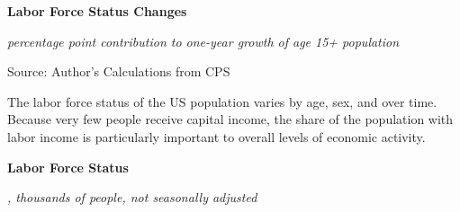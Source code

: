 \documentclass{report}
\makeatletter
\newcommand{\tbllink}[1]{\href{https://raw.githubusercontent.com/bdecon/US-chartbook/master/chartbook/data/#1}{\faTable}}
\newcommand*\short[1]{\expandafter\@gobbletwo\number\numexpr#1\relax}
\newcommand{\ctsbar}[5]{
		\addplot[ybar stacked, bar width=#5, draw opacity=0, fill=#1] 
			table [x=#2, y=#3, col sep=comma]{#4};}
\newcommand{\dateaxisticks}{
		date coordinates in=x, axis line style={draw=none},
		xmax={2020-10-01},
		max space between ticks=40,	    
		xtick={{1990-01-01}, {1992-01-01}, {1994-01-01}, 
			{1996-01-01}, {1998-01-01}, {2000-01-01}, 
			{2002-01-01}, {2004-01-01}, {2006-01-01},
			{2008-01-01}, {2010-01-01}, {2012-01-01}, {2014-01-01},
		    {2016-01-01}, {2018-01-01}, {2020-01-01}},
		minor xtick={{1989-01-01}, {1991-01-01}, {1993-01-01},
			{1995-01-01}, {1997-01-01}, {1999-01-01}, 
			{2001-01-01}, {2003-01-01}, {2005-01-01}, {2007-01-01},
		    {2009-01-01}, {2011-01-01}, {2013-01-01}, {2015-01-01},
		    {2017-01-01}, {2019-01-01}},
		enlarge y limits={0.06}, enlarge x limits={0.01},
		}
\newcommand{\bbar}[2]{extra #1 ticks = {{#2}}, extra #1 tick labels = ,
		extra #1 tick style = {grid=major, grid style={thick, black!25}},}
\newcommand{\rbars}{
		\fill[color=black!10] (axis cs:{1990-07-01},\pgfkeysvalueof{/pgfplots/ymin}) rectangle 
			(axis cs:{1991-03-01}, \pgfkeysvalueof{/pgfplots/ymax});
		\fill[color=black!10] (axis cs:{2007-12-01},\pgfkeysvalueof{/pgfplots/ymin}) rectangle 
			(axis cs:{2009-07-01}, \pgfkeysvalueof{/pgfplots/ymax});
		\fill[color=black!10] (axis cs:{2001-03-01},\pgfkeysvalueof{/pgfplots/ymin}) rectangle 
			(axis cs:{2001-11-01}, \pgfkeysvalueof{/pgfplots/ymax});
		\fill[color=black!10] (axis cs:{2020-02-01},\pgfkeysvalueof{/pgfplots/ymin}) rectangle 
			(axis cs:{2020-10-01}, \pgfkeysvalueof{/pgfplots/ymax});}
\makeatother
\begin{document}
{{{{{{\begin{minipage}{0.76\textwidth}
\vspace{5mm}

\normalsize \textbf{Labor Force Status Changes}

\footnotesize{\textit{percentage point contribution to one-year growth of age 15+ population}}

\hspace*{-2mm} 

\footnotesize{Source: Author's Calculations from CPS} \hfill \tbllink{cps_lfs2.csv}

\end{minipage}

\newpage

\begin{minipage}{0.76\textwidth}

\small The labor force status of the US population varies by age, sex, and over time. Because very few people receive capital income, the share of the population with labor income is particularly important to overall levels of economic activity. 

\vspace{3mm}

\noindent \normalsize \textbf{Labor Force Status}

\footnotesize{\textit{\unskip, thousands of people, not seasonally adjusted}}

\noindent {} \setlength{\tabcolsep}{3.0pt} \color{black!90}
		{\renewcommand{\arraystretch}{1.52}
		 \begin{tabular}{p{27.8mm} R{11.2mm} R{10.4mm} R{10.4mm} R{10.2mm} 
		 				 R{10.6mm} R{10.4mm} R{10.4mm}}
			 \hline
		\end{tabular}}
		
\vspace{1mm}	
	

\end{minipage}}}}}}}
\end{document}
